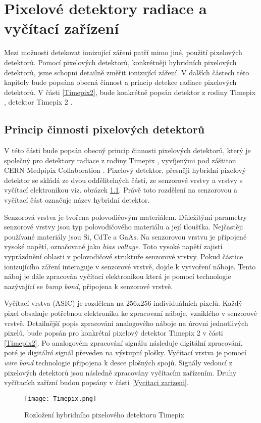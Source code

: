 \chapter{Pixelové detektory radiace a vyčítací zařízení}	%
\label{kap:2}
Mezi možnosti detekovat ionizující záření patří mimo jiné, použití pixelových detektorů. Pomocí pixelových detektorů, konkrétněji hybridních pixelových detektorů, jsme schopni detailně změřit ionizující záření. V dalších částech této kapitoly bude popsána obecná činnost a princip detekce radiace pixelových detektorů. V části \ref{Timepix2}, bude konkrétně popsán detektor z rodiny Timepix \cite{Llopart}, detektor Timepix 2 \cite{tpx2_manual}. 

\section{Princip činnosti pixelových detektorů}
\label{kap:2.1}
V této části bude popsán obecný princip činnosti pixelových detektorů, který je společný pro detektory radiace z rodiny Timepix \cite{Llopart}, vyvíjenými pod záštitou CERN Medpipix Collaboration \cite{Medpix}. Pixelový detektor, přesněji hybridní pixelový detektor se skládá ze dvou oddělitelných částí, ze senzorové vrstvy a vrstvy s vyčítací elektronikou viz. obrázek \ref{fig:Timepix}. Právě toto rozdělení na senzorovou a vyčítací část označuje název hybridní detektor.
\par Senzorová vrstva je tvořena polovodičovým materiálem. Důležitými parametry senzorové vrstvy jsou typ polovodičového materiálu a její tloušťka. Nejčastěji používané materiály jsou $\text{Si}$, $\text{CdTe}$ a $\text{GaAs}$. Na senzorovou vrstvu je připojené vysoké napětí, označované jako \textit{bias voltage}. Toto vysoké napětí zajistí vyprázdnění oblasti v polovodičové struktuře senzorové vrstvy. Pokud částice ionizujícího záření interaguje v senzorové vrstvě, dojde k vytvoření náboje. Tento náboj je dále zpracován vyčítací elektronikou která je pomocí technologie nazývající se \textit{bump bond}, připojena k senzorové vrstvě.
\par Vyčítací vrstva (ASIC) je rozdělena na 256x256 individuálních pixelů. Každý pixel obsahuje potřebnou elektroniku ke zpracovaní náboje, vzniklého v senzorové vrstvě. Detailnější popis zpracování analogového náboje na úrovni jednotlivých pixelů, bude popsán pro konkrétní pixelový detektor Timepix 2 v části \ref{Timepix2}. Po analogovém zpracování signálu následuje digitální zpracování, poté je digitální signál převeden na výstupní plošky. Vyčítací vrstva je pomocí \textit{wire bond} technologie připojena k desce plošných spojů. Signály vedoucí z pixelových detektorů jsou následně zpracovány vyčítacím zařízením. Druhy vyčítacích zařízní budou popsány v části \ref{Vycitaci zarizeni}.
 \begin{figure}[h!]
 	\centering
 	\captionsetup{justification=centering}
 	\texttt{[image: Timepix.png]}
 	\caption{Rozložení hybridního pixelového detektoru Timepix \cite{Platkevic}} 
 	\label{fig:Timepix}
 \end{figure}	

